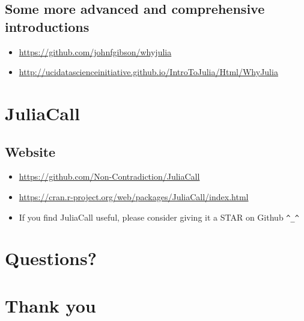 \documentclass[11pt]{article}
\begin{document}
\hypertarget{some-more-advanced-and-comprehensive-introductions}{%
\subsection{Some more advanced and comprehensive
introductions}\label{some-more-advanced-and-comprehensive-introductions}}

\begin{itemize}
\item
  \url{https://github.com/johnfgibson/whyjulia}
\item
  \url{http://ucidatascienceinitiative.github.io/IntroToJulia/Html/WhyJulia}
\end{itemize}

    \hypertarget{juliacall}{%
\section{JuliaCall}\label{juliacall}}

\hypertarget{website}{%
\subsection{Website}\label{website}}

\begin{itemize}
\item
  \url{https://github.com/Non-Contradiction/JuliaCall}
\item
  \url{https://cran.r-project.org/web/packages/JuliaCall/index.html}
\item
  If you find JuliaCall useful, please consider giving it a STAR on
  Github \texttt{\^{}\_\^{}}
\end{itemize}

    \hypertarget{questions}{%
\section{Questions?}\label{questions}}

    \hypertarget{thank-you}{%
\section{Thank you}\label{thank-you}}


    
    
    
    
\end{document}
